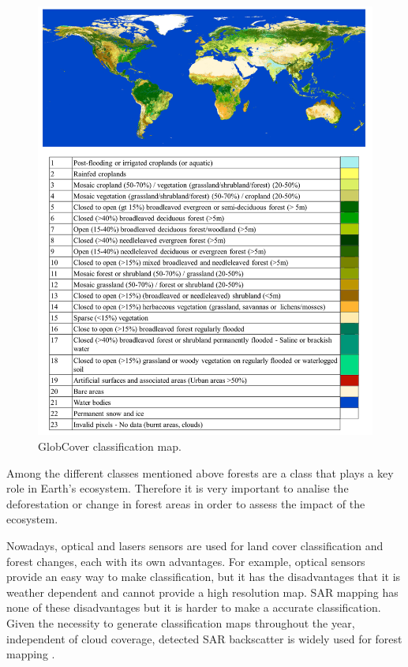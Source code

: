 \begin{figure}[H]
    \centering
    \includegraphics[width=\linewidth]{Cap2/glob_cover.png}
    \caption{GlobCover classification map.}
    \label{fig:glob_cover_map}
\end{figure}

Among the different classes mentioned above forests are a class that plays a key role in Earth's ecosystem. Therefore it is very important to analise the deforestation or change in forest areas in order to assess the impact of the ecosystem. 

Nowadays, optical and lasers sensors are used for land cover classification and forest changes, each with its own advantages. For example, optical sensors provide an easy way to make classification, but it has the disadvantages that it is weather dependent and cannot provide a high resolution map. SAR mapping has none of these disadvantages but it is harder to make a accurate classification. Given the necessity to generate classification maps throughout the year, independent of cloud coverage, detected SAR backscatter is widely used for forest mapping \cite{Krieger}. 

